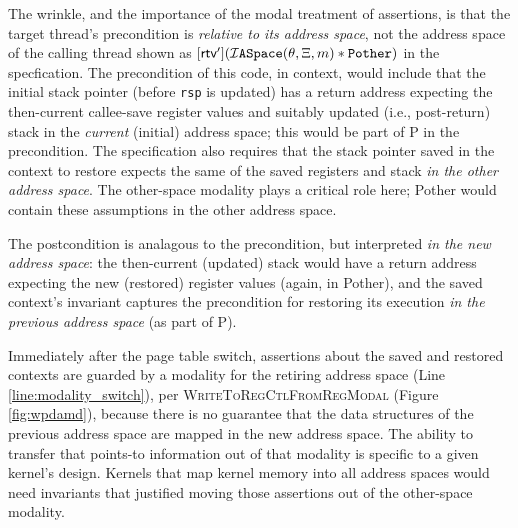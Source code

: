The wrinkle, and the importance of the modal treatment of assertions, is that the target thread's precondition is \emph{relative to its address space}, 
not the address space of the calling thread shown as 
$[\textsf{rtv}'](\mathcal{I}\texttt{ASpace}(\theta,\Xi,m) \ast \texttt{Pother})$
in the specfication. 
The precondition of this code,
in context, would include that the initial stack pointer (before \lstinline|rsp| is updated)
has a return address expecting the then-current callee-save register values and 
suitably updated (i.e., post-return) stack in the \emph{current} (initial) address space;
this would be part of \textsf{P} in the precondition.
The specification also requires that
the stack pointer saved in the context to restore expects the same of the saved registers and stack 
\emph{in the other address space}. 
The other-space modality plays a critical role here; \textsf{Pother} would contain these assumptions in the other
address space.


The postcondition is analagous to the precondition, but interpreted \emph{in the new address space}: the then-current (updated) stack would have a return address expecting the new (restored) register values (again, in \textsf{Pother}),
and the saved context's invariant captures the precondition for restoring its execution \emph{in the previous address space} (as part of \textsf{P}). 

Immediately after the page table switch, assertions about the saved and restored contexts are
guarded by a modality for the retiring
address space \rtv{} (Line \ref{line:modality_switch}), per
\textsc{WriteToRegCtlFromRegModal} (Figure \ref{fig:wpdamd}),
because
there is no guarantee that the data structures of the previous address space are mapped in the new address space.
The ability to transfer that points-to information out of that modality is specific to a given kernel's design. 
Kernels that map kernel memory into all address spaces would need invariants
that justified moving those assertions out of the other-space modality.

